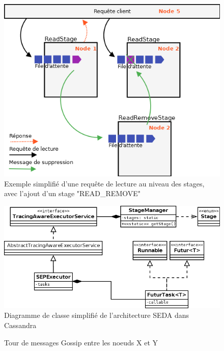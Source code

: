 \documentclass[12pt]{article}
\begin{document}
\begin{figure}[p]
	\centering
		\includegraphics[width=15cm]{images/architecture/read_request.png}
	\caption{Exemple simplifié d'une requête de lecture au niveau des stages, avec l'ajout d'un stage "READ\_REMOVE" \label{fig:read_request}}
\end{figure}

\begin{figure}[p]
	\centering
		\includegraphics[width=15cm]{images/architecture/stages_diagram.png}
	\caption{Diagramme de classe simplifié de l'architecture SEDA dans Cassandra \label{fig:stages_diagram}}
\end{figure}

\begin{figure}[p]
	\centering
		
	\caption{Tour de messages Gossip entre les noeuds X et Y \label{fig:round_gossip}}
\end{figure}
\end{document}
